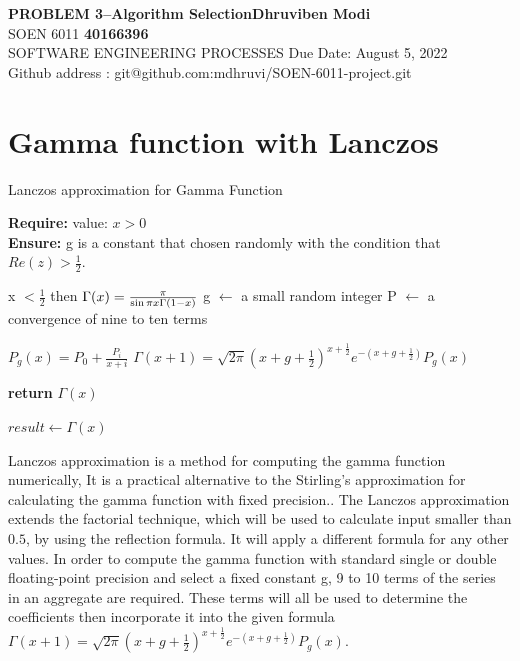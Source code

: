 \documentclass[a4paper, 11pt]{article}
\begin{document}
\noindent
\large\textbf{PROBLEM 3--Algorithm Selection}\hfill \textbf{Dhruviben Modi} \\
\normalsize SOEN 6011 \hfill \textbf{40166396} \\
 SOFTWARE ENGINEERING PROCESSES \hfill Due Date: August 5, 2022 \\
\hfill Github address : git@github.com:mdhruvi/SOEN-6011-project.git

\section{Gamma function with Lanczos}

\begin{algorithm}
\caption{Lanczos approximation for Gamma Function}

\textbf{Require:}  value: $x > 0$  \\
\textbf{Ensure:} g is a constant that chosen randomly with the condition that  $ Re(z) > \frac{1}{2}$.

\begin{algorithmic}[1]

    \If x $< \frac{1}{2}$ then
    \State  $\Gamma (x)={\pi  \over \sin \pi x \Gamma (1-x)}$ 
    \EndIf
    \State g $\leftarrow$  a small random integer
    \State P $\leftarrow$ a convergence of nine to ten terms 
    
    
    \State $P_{g}(x)=P_{0}+{\frac  {P_{i}}{x+i}}$
    \EndFor
    \State ${\displaystyle \Gamma (x+1)={\sqrt {2\pi }}{\left(x+g+{\tfrac {1}{2}}\right)}^{x+{\frac {1}{2}}}e^{-\left(x+g+{\frac {1}{2}}\right)}P_{g}(x)}$
    
    \State \textbf{return} $\Gamma (x)$
    \EndProcedure
\Statex

\State $result \leftarrow \Gamma (x)$ 

\end{algorithmic}
\end{algorithm}

Lanczos approximation is a method for computing the gamma function numerically, It is a practical alternative to the Stirling's approximation for calculating the gamma function with fixed precision.. The Lanczos approximation extends the factorial technique, which will be used to calculate input smaller than $0.5$, by using the reflection formula. It will apply a different formula for any other values. In order to compute the gamma function with standard single or double floating-point precision and select a fixed constant g, 9 to 10 terms of the series in an aggregate are required. These terms will all be used to determine the coefficients then incorporate it into the given formula ${\displaystyle \Gamma (x+1)={\sqrt {2\pi }}{\left(x+g+{\tfrac {1}{2}}\right)}^{x+{\frac {1}{2}}}e^{-\left(x+g+{\frac {1}{2}}\right)}P_{g}(x)}$.
\end{document}
